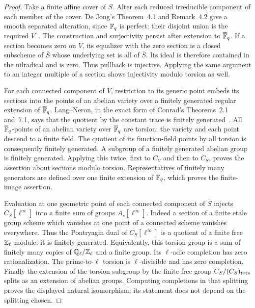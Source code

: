 \begin{proof}
Take a finite affine cover of \(S\).  Alter each reduced
irreducible component of each member of the cover.  De Jong's
Theorem~4.1 and Remark~4.2 give a smooth separated alteration,
since \(\mathbb F_q\) is perfect; their disjoint union is the
required \(V\)~\cite{c_dejong1996}.  The construction and
surjectivity persist after extension to \(\overline{\mathbb F}_q\).
If a section becomes zero on \(\bar V\), its equalizer with
the zero section is a closed subscheme of \(\bar S\) whose
underlying set is all of \(\bar S\).  Its ideal is therefore
contained in the nilradical and is zero.  Thus pullback is
injective.  Applying the same argument to an integer multiple of
a section shows injectivity modulo torsion as well.

For each connected component of \(\bar V\), restriction to
its generic point embeds its sections into the points of an
abelian variety over a finitely generated regular extension of
\(\overline{\mathbb F}_q\).  Lang--Neron, in the exact form of
Conrad's Theorems~2.1 and~7.1, says that the quotient by the
constant trace is finitely generated~\cite{BConrad2006}.  All
\(\overline{\mathbb F}_q\)-points of an abelian variety over
\(\overline{\mathbb F}_q\) are torsion: the variety and each point
descend to a finite field.  The quotient of its function-field
points by all torsion is consequently finitely generated.  A
subgroup of a finitely generated abelian group is finitely
generated.  Applying this twice, first to \(C_V\) and then to
\(C_S\), proves the assertion about sections modulo torsion.
Representatives of finitely many generators are defined over one
finite extension of \(\mathbb F_q\), which proves the finite-image
assertion.

Evaluation at one geometric point of each connected component of
\(\bar S\) injects \(C_S[\ell^\infty]\) into a finite
sum of groups \(A_{\bar s}[\ell^\infty]\).  Indeed a section
of a finite etale group scheme which vanishes at one point of a
connected scheme vanishes everywhere.  Thus the Pontryagin dual
of \(C_S[\ell^\infty]\) is a quotient of a finite free
\(\mathbb Z_\ell\)-module; it is finitely generated.  Equivalently,
this torsion group is a sum of finitely many copies of
\(\mathbb Q_\ell/\mathbb Z_\ell\) and a finite group.  Its
\(\ell\)-adic completion has zero rationalization.  The
prime-to-\(\ell\) torsion is \(\ell\)-divisible and has
zero completion.  Finally the extension of the torsion subgroup
by the finite free group \(C_S/(C_S)_{\rm tors}\) splits as
an extension of abelian groups.  Computing completions in that
splitting proves the displayed natural isomorphism; its statement
does not depend on the splitting chosen.
\end{proof}

